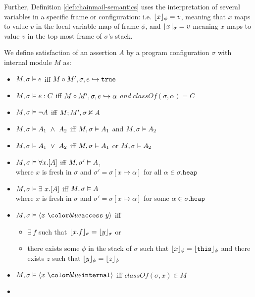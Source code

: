 Further, Definition \ref{def:chainmail-semantics} uses the interpretation of several variables
in a specific frame or configuration: i.e. $\lfloor x \rfloor_{\phi} = v$, meaning that $x$ maps to
value $v$ in the local variable map of frame $\phi$, and $\lfloor x \rfloor_{\sigma} = v$ meaning $x$ 
maps to value $v$ in the top most frame of $\sigma$'s stack.
\begin{definition} 
\label{def:chainmail-semantics}
We define satisfaction of an assertion $A$ by a program configuration $\sigma$ with internal module $M$ as:
\begin{itemize}
\item
$M , \sigma \vDash e$ iff $M \circ M', \sigma, e \hookrightarrow \texttt{true}$
\item
$M , \sigma \vDash e : C$ iff $M \circ M', \sigma, e \hookrightarrow \alpha$ \textit{and} $\textit{classOf}(\sigma, \alpha) = C$
\item
$M , \sigma \vDash \neg A$ iff $M ; M', \sigma \nvDash A$
\item
$\satisfiesA{M}{\sigma}{A_1\ \wedge\ A_2}$ iff $M , \sigma \vDash A_1$ and 
$M , \sigma \vDash A_2$
\item
$\satisfiesA{M}{\sigma}{A_1\ \vee\ A_2}$ iff $M , \sigma \vDash A_1$ or 
$M , \sigma \vDash A_2$
\item
$M , \sigma \vDash \forall x.[A]$ iff 
$M , \sigma' \vDash A$,\\
where $x$ is fresh in $\sigma$ and $\sigma' = \sigma[x \mapsto \alpha]$
for all $\alpha \in \sigma.\texttt{heap}$
\item
$M , \sigma \vDash \exists\ x.[A]$ iff 
$M , \sigma \vDash A$ \\
where $x$ is fresh in $\sigma$ and $\sigma' = \sigma[x \mapsto \alpha]$
for some $\alpha \in \sigma.\texttt{heap}$
\item
$\satisfiesA{M}{\sigma}{\access{x}{y}}$ iff 
\begin{itemize}
\item
$\exists\ f$ such that $\lfloor x.f \rfloor_{\sigma}={\lfloor y \rfloor_{\sigma}}$ or
\item
there exists some $\phi$ in the stack of $\sigma$ such that $\lfloor x \rfloor_{\phi}=\lfloor {\texttt{this}} \rfloor_{\phi}$ 
and there exists $z$ such that $\lfloor y \rfloor_{\phi}=\lfloor z \rfloor_{\phi}$
\end{itemize}
\item
$\satisfiesA{M}{\sigma}{\internal{x}}$ iff 
$\textit{classOf}(\sigma,x) \in M$
\item

\end{itemize}
\end{definition}
